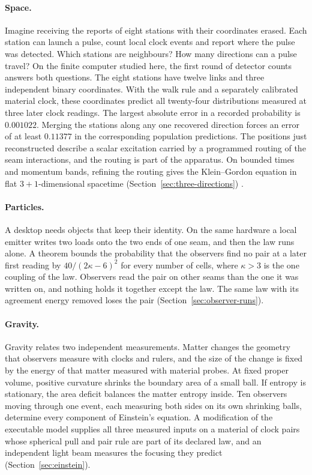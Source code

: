 \documentclass[11pt]{article}
\theoremstyle{definition}
\theoremstyle{remark}
\begin{document}
\paragraph{Space.} Imagine receiving the reports of eight stations with
their coordinates erased. Each station can launch a pulse, count local
clock events and report where the pulse was detected. Which stations are
neighbours? How many directions can a pulse travel? On the finite
computer studied here, the first round of detector counts answers both
questions. The eight stations have twelve links and three independent
binary coordinates. With the walk rule and a separately calibrated
material clock, these coordinates predict all twenty-four distributions
measured at three later clock readings. The largest absolute error in a
recorded probability is $0.001022$. Merging the stations along any one
recovered direction forces an error of at least $0.11377$ in the
corresponding population predictions. The positions just reconstructed
describe a scalar excitation carried by a programmed routing of the seam
interactions, and the routing is part of the apparatus. On bounded times
and momentum bands, refining the routing gives the Klein--Gordon
equation in flat $3{+}1$-dimensional spacetime
(Section~\ref{sec:three-directions}) \cite{ophmodel}.

\paragraph{Particles.} A desktop needs objects that keep their identity.
On the same hardware a local emitter writes two loads onto the two ends
of one seam, and then the law runs alone. A theorem bounds the
probability that the observers find no pair at a later first reading by
$40/(2\kappa-6)^2$ for every number of cells, where $\kappa>3$ is the one
coupling of the law. Observers read the pair on other seams than the one
it was written on, and nothing holds it together except the law.
The same law with its agreement energy removed loses the pair
(Section~\ref{sec:observer-runs}).

\paragraph{Gravity.} Gravity relates two independent measurements.
Matter changes the geometry that observers measure with clocks and
rulers, and the size of the change is fixed by the energy of that matter
measured with material probes. At fixed proper volume, positive
curvature shrinks the boundary area of a small ball. If entropy is
stationary, the area deficit balances the matter entropy inside. Ten
observers moving through one event, each measuring both sides on its own
shrinking balls, determine every component of Einstein's equation. A
modification of the executable model supplies all three measured inputs
on a material of clock pairs whose spherical pull and pair rule are part
of its declared law, and an independent light beam measures the focusing they predict
(Section~\ref{sec:einstein}).
\end{document}
